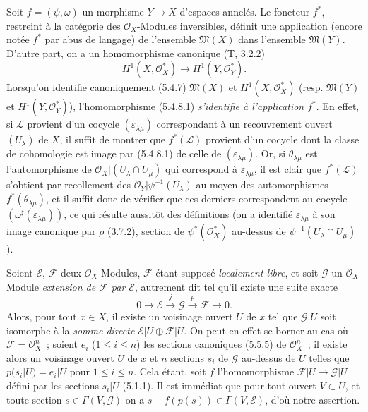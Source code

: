 \begin{env}[5.4.8]
\label{0.5.4.8-fr}
Soit $f=(\psi,\omega)$ un morphisme $Y\to X$ d'espaces annelés. Le foncteur
$f^*$, restreint à la catégorie des $\mathcal{O}_X$-Modules inversibles,
définit une application (encore notée $f^*$ par abus de langage) de l'ensemble
$\mathfrak{M}(X)$ dans l'ensemble $\mathfrak{M}(Y)$. D'autre part, on a un
homomorphisme canonique (T, 3.2.2)
\[
  H^1(X,\mathcal{O}_X^*)\longrightarrow H^1(Y,\mathcal{O}_Y^*).
  \tag{5.4.8.1}\label{0.5.4.8.1-fr}
\]
Lorsqu'on identifie canoniquement (5.4.7) $\mathfrak{M}(X)$ et
$H^1(X,\mathcal{O}_X^*)$ (resp. $\mathfrak{M}(Y)$ et
$H^1(Y,\mathcal{O}_Y^*)$), l'homomorphisme (5.4.8.1) \emph{s'identifie à
l'application $f^*$}. En effet, si $\mathcal{L}$ provient d'un cocycle
$(\varepsilon_{\lambda\mu})$ correspondant à un recouvrement ouvert
$(U_\lambda)$ de $X$, il suffit de montrer que $f^*(\mathcal{L})$ provient
d'un cocycle dont la classe de cohomologie est image par (5.4.8.1) de celle de
$(\varepsilon_{\lambda\mu})$. Or, si $\theta_{\lambda\mu}$ est
l'automorphisme de $\mathcal{O}_X|(U_\lambda\cap U_\mu)$ qui correspond à
$\varepsilon_{\lambda\mu}$, il est clair que $f^*(\mathcal{L})$ s'obtient par
recollement des $\mathcal{O}_Y|\psi^{-1}(U_\lambda)$ au moyen des
automorphismes $f^*(\theta_{\lambda\mu})$, et il suffit donc de vérifier que
ces derniers correspondent au cocycle
$(\omega^\sharp(\varepsilon_{\lambda\mu}))$, ce qui résulte aussitôt des
définitions (on a identifié $\varepsilon_{\lambda\mu}$ à son image canonique
par $\rho$ (3.7.2), section de $\psi^*(\mathcal{O}_X^*)$ au-dessus de
$\psi^{-1}(U_\lambda\cap U_\mu)$).
\end{env}

\begin{env}[5.4.9]
\label{0.5.4.9-fr}
Soient $\mathcal{E}$, $\mathcal{F}$ deux $\mathcal{O}_X$-Modules,
$\mathcal{F}$ étant supposé \emph{localement libre}, et soit $\mathcal{G}$ un
$\mathcal{O}_X$-Module \emph{extension de $\mathcal{F}$ par $\mathcal{E}$},
autrement dit tel qu'il existe une suite exacte
\[
  0\longrightarrow\mathcal{E}\xrightarrow{j}\mathcal{G}
  \xrightarrow{p}\mathcal{F}\longrightarrow 0.
\]
Alors, pour tout $x\in X$, il existe un voisinage ouvert $U$ de $x$ tel que
$\mathcal{G}|U$ soit isomorphe à la \emph{somme directe}
$\mathcal{E}|U\oplus\mathcal{F}|U$. On peut en effet se borner au cas où
$\mathcal{F}=\mathcal{O}_X^n$~; soient $e_i$ ($1\leq i\leq n$) les sections
canoniques (5.5.5) de $\mathcal{O}_X^n$~; il existe alors un voisinage ouvert
$U$ de $x$ et $n$ sections $s_i$ de $\mathcal{G}$ au-dessus de $U$ telles que
$p(s_i|U)=e_i|U$ pour $1\leq i\leq n$. Cela étant, soit $f$
l'homomorphisme $\mathcal{F}|U\to\mathcal{G}|U$ défini par les sections
$s_i|U$ (5.1.1). Il est immédiat que pour tout ouvert $V\subset U$, et toute
section $s\in\Gamma(V,\mathcal{G})$ on a
$s-f(p(s))\in\Gamma(V,\mathcal{E})$, d'où notre assertion.
\end{env}

